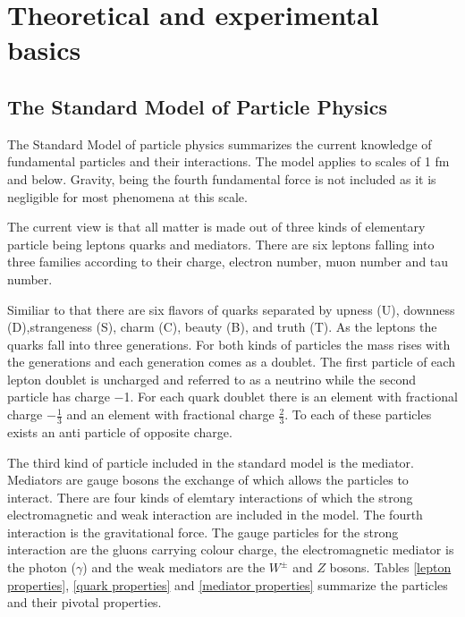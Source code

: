 \chapter{Theoretical and experimental basics}
\label{theory}

\section{The Standard Model of Particle Physics}

The Standard Model of particle physics summarizes the current knowledge of fundamental particles and their interactions. The model applies to scales of 1 fm and below. Gravity, being the fourth fundamental force is not included as it is negligible for most phenomena at this scale.

The current view is that all matter is made out of three kinds of elementary particle being leptons quarks and mediators.
There are six leptons falling into three families according to their charge, electron number, muon number and tau number. 

Similiar to that there are six flavors of quarks separated by upness (U), downness (D),strangeness (S), charm (C), beauty (B), and truth (T). As the leptons the quarks fall into three generations.
For both kinds of particles the mass rises with the generations and each generation comes as a doublet. The first particle of each lepton doublet is uncharged and referred to as a neutrino while the second particle has charge \num{-1}.
For each quark doublet there is an element with fractional charge $-\frac{1}{3}$ and an element with fractional charge $\frac{2}{3}$.
To each of these particles exists an anti particle of opposite charge.

The third kind of particle included in the standard model is the mediator. Mediators are gauge bosons the exchange of which allows the particles to interact. There are four kinds of elemtary interactions of which the strong electromagnetic and weak interaction are included in the model. The fourth interaction is the gravitational force.
The gauge particles for the strong interaction are the gluons carrying colour charge, the electromagnetic mediator is the photon ($\gamma$) and the weak mediators are the $W^{\pm}$ and $Z$ bosons.
Tables \ref{lepton properties}, \ref{quark properties} and \ref{mediator properties} summarize the particles and their pivotal properties.
\newpage


